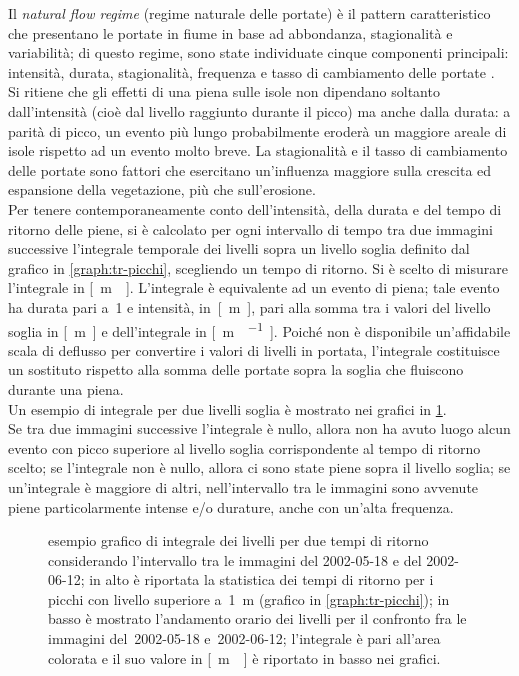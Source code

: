 Il \emph{natural flow regime} (regime naturale delle portate) è il pattern caratteristico che presentano le portate in fiume in base ad abbondanza, stagionalità e variabilità; di questo regime, sono state individuate cinque componenti principali: intensità, durata, stagionalità, frequenza e tasso di cambiamento delle portate .
\\
Si ritiene che gli effetti di una piena sulle isole non dipendano soltanto dall'intensità (cioè dal livello raggiunto durante il picco) ma anche dalla durata: a parità di picco, un evento più lungo probabilmente eroderà un maggiore areale di isole rispetto ad un evento molto breve.
La stagionalità e il tasso di cambiamento delle portate sono fattori che esercitano un'influenza maggiore sulla crescita ed espansione della vegetazione, più che sull'erosione. 
\\
Per tenere contemporaneamente conto dell'intensità, della durata e del tempo di ritorno delle piene, si è calcolato per ogni intervallo di tempo tra due immagini successive l'integrale temporale dei livelli sopra un livello soglia definito dal grafico in \cref{graph:tr-picchi}, scegliendo un tempo di ritorno.
Si è scelto di misurare l'integrale in \si{[\m\giorno]}.
L'integrale è equivalente ad un evento di piena; tale evento ha durata pari a~\SI{1}{\giorno} e intensità, in~\si{[\m]}, pari alla somma tra i valori del livello soglia in \si{[\m]} e dell'integrale in \si{[\m\giorno\per\giorno]}.
Poiché non è disponibile un'affidabile scala di deflusso per convertire i valori di livelli in portata, l'integrale costituisce un sostituto rispetto alla somma delle portate sopra la soglia che fluiscono durante una piena.
\\
Un esempio di integrale per due livelli soglia è mostrato nei grafici in \cref{graph:esempio-integrale-livelli}.
\\
Se tra due immagini successive l'integrale è nullo, allora non ha avuto luogo alcun evento con picco superiore al livello soglia corrispondente al tempo di ritorno scelto;
se l'integrale non è nullo, allora ci sono state piene sopra il livello soglia;
se un'integrale è maggiore di altri, nell'intervallo tra le immagini sono avvenute piene particolarmente intense e/o durature, anche con un'alta frequenza.
%
\begin{figure}
	\centering
		
	\caption[esempio di integrale dei livelli]{esempio grafico di integrale dei livelli per due tempi di ritorno considerando l'intervallo tra le immagini \AST{} del 2002-05-18 e del 2002-06-12; in alto è riportata la statistica dei tempi di ritorno per i picchi con livello superiore a~\SI{1}{\m} (grafico in \cref{graph:tr-picchi}); in basso è mostrato l'andamento orario dei livelli per il confronto fra le immagini \AST{} del~2002-05-18 e~2002-06-12; l'integrale è pari all'area colorata e il suo valore in \si{[\m\giorno]} è riportato in basso nei grafici.}
	\label{graph:esempio-integrale-livelli}
\end{figure}
%


